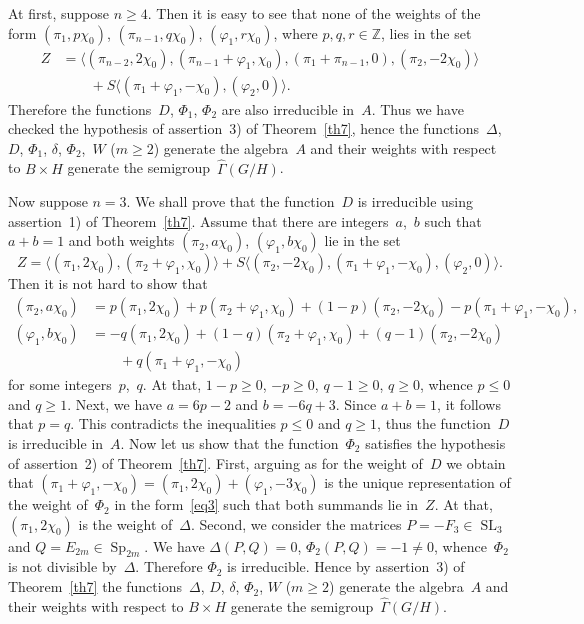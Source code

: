 \documentclass[12pt]{amsart}
\theoremstyle{definition}
\theoremstyle{remark}
\begin{document}
At first, suppose $n{\geqslant}4$. Then it is easy to see that none of the
weights of the form $(\pi_1,p\chi_0)$, $(\pi_{n-1},q\chi_0)$,
$(\varphi_1,r\chi_0)$, where $p,q,r\in\mathbb{Z}$, lies in the set
\begin{align*}
Z&=\bigl\langle(\pi_{n-2},2\chi_0), (\pi_{n-1}+\varphi_1,\chi_0),
(\pi_1+\pi_{n-1},0),(\pi_2,-2\chi_0)\bigr\rangle
\\
&\qquad+S\bigl\langle(\pi_1+\varphi_1,-\chi_0),(\varphi_2,0)\bigr\rangle.
\end{align*}
Therefore the functions~$D$, $\Phi_1$, $\Phi_2$ are also irreducible
in~$A$. Thus we have checked the hypothesis of assertion~3) of
Theorem~\ref{th7}, hence the functions~$\Delta$, $D$, $\Phi_1$,
$\delta$, $\Phi_2$,~$W$ ($m{\geqslant}2$) generate the algebra~$A$ and their
weights with respect to $B\times H$ generate the
semigroup~$\widehat\Gamma(G/H)$.

Now suppose $n=3$. We shall prove that the function~$D$ is
irreducible using assertion~1) of Theorem~\ref{th7}. Assume that
there are integers~$a$,~$b$ such that $a+b=1$ and both weights
$(\pi_2,a\chi_0)$, $(\varphi_1,b\chi_0)$ lie in the set
$$
Z=\bigl\langle(\pi_1,2\chi_0),(\pi_2+\varphi_1,\chi_0)\bigr\rangle+
S\bigl\langle(\pi_2,-2\chi_0),(\pi_1+\varphi_1,-\chi_0),(\varphi_2,0)\bigr\rangle.
$$
Then it is not hard to show that
\begin{align*}
(\pi_2,a\chi_0)&=p(\pi_1,2\chi_0)+p(\pi_2+\varphi_1,\chi_0)+
(1-p)(\pi_2,-2\chi_0)-p(\pi_1+\varphi_1,-\chi_0),
\\
(\varphi_1,b\chi_0)&=-q(\pi_1,2\chi_0)+(1-q)(\pi_2+\varphi_1,\chi_0)+
(q-1)(\pi_2,-2\chi_0)
\\
&\qquad+q(\pi_1+\varphi_1,-\chi_0)
\end{align*}
for some integers~$p$,~$q$. At that, $1-p{\geqslant}0$, $-p{\geqslant}0$, $q-1{\geqslant}0$,
$q{\geqslant}0$, whence $p{\leqslant}0$ and $q{\geqslant}1$. Next, we have $a=6p-2$ and
$b=-6q+3$. Since $a+b=1$, it follows that $p=q$. This contradicts
the inequalities $p{\leqslant}0$ and $q{\geqslant}1$, thus the function~$D$ is
irreducible in~$A$. Now let us show that the function~$\Phi_2$
satisfies the hypothesis of assertion~2) of Theorem~\ref{th7}.
First, arguing as for the weight of~$D$ we obtain that
$(\pi_1+\varphi_1,-\chi_0)=(\pi_1,2\chi_0)+(\varphi_1,-3\chi_0)$ is
the unique representation of the weight of~$\Phi_2$ in the
form~\eqref{eq3} such that both summands lie in~$Z$. At that,
$(\pi_1,2\chi_0)$ is the weight of~$\Delta$. Second, we consider the
matrices $P=-F_3\in{\operatorname{SL}}_3$ and $Q=E_{2m}\in{\operatorname{Sp}}_{2m}$. We have
$\Delta(P,Q)=0$, $\Phi_2(P,Q)=-1\ne0$, whence~$\Phi_2$ is not
divisible by~$\Delta$. Therefore $\Phi_2$ is irreducible. Hence by
assertion~3) of Theorem~\ref{th7} the functions~$\Delta$, $D$,
$\delta$, $\Phi_2$, $W$ ($m{\geqslant}2$) generate the algebra~$A$ and their
weights with respect to $B\times H$ generate the
semigroup~$\widehat\Gamma(G/H)$.
\end{document}
